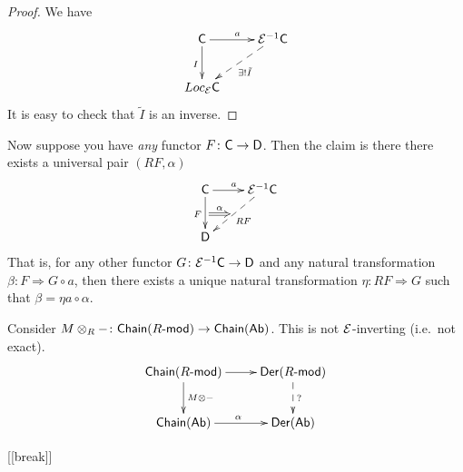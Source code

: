 \begin{proof}
 We have
 \[\xymatrix{
  \C\ar[d]_I \ar[r]^a & \E^{-1}\C\ar@{-->}[dl]^{\exists ! \tilde I}\\
  Loc_\E \C
 }\]
 It is easy to check that $\tilde I$ is an inverse.
\end{proof}
Now suppose you have \emph{any} functor $F\colon \text{\sf C}\to \text{\sf D}$. Then the claim is there there exists a universal pair $(RF,\alpha)$
\[\xymatrix{
 \C\ar[r]^a \ar[d]_F^{}="b" & \E^{-1}\C\ar@{-->}[dl]^{RF}_{}="a"\\
 \D
 \ar@{=>}^\alpha "b";"a"
}\]
That is, for any other functor $G\colon \mathcal{E}^{-1}\text{\sf C}\to \text{\sf D}$ and any natural transformation $\beta\colon F\Rightarrow G\circ a$, then there exists a unique natural transformation $\eta\colon RF\Rightarrow G$ such that $\beta = \eta a \circ \alpha$.
\begin{example}
 Consider $M\otimes_R -\colon \text{\sf Chain}(R\textrm{-\sf mod})\to \text{\sf Chain}(\text{\sf Ab})$. This is not $\mathcal{E}$-inverting (i.e.~not exact).
 \[\xymatrix{
  \chain(R\mod)\ar[d]^{M\otimes -} \ar[r] & \Der(R\mod)\ar@{-->}[d]^{?}\\
  \chain(\ab)\ar[r]^\alpha & \Der(\ab)
 }\]
\end{example}

[[break]]

